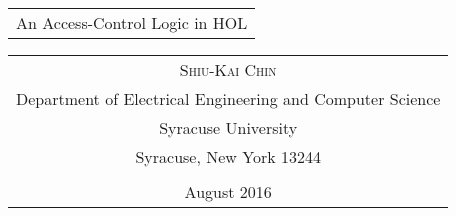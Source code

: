 \begin{titlepage}
  \setcounter{page}{1} %

\vspace*{45mm}

{\selectfont
\begin{center}
\vspace*{0.8in}
  \scalebox{1.4}
  {\begin{tabular}{c} 
      \Large{An Access-Control Logic in HOL}
    \end{tabular}}
  \begin{tabular}[h]{c}
    \textsc{Shiu-Kai Chin}\\
    Department of Electrical Engineering and Computer Science\\
    Syracuse University\\
    Syracuse, New York 13244\\\\
    August 2016
  \end{tabular}

\end{center}}
\end{titlepage}

\thispagestyle{empty}
\cleardoublepage



